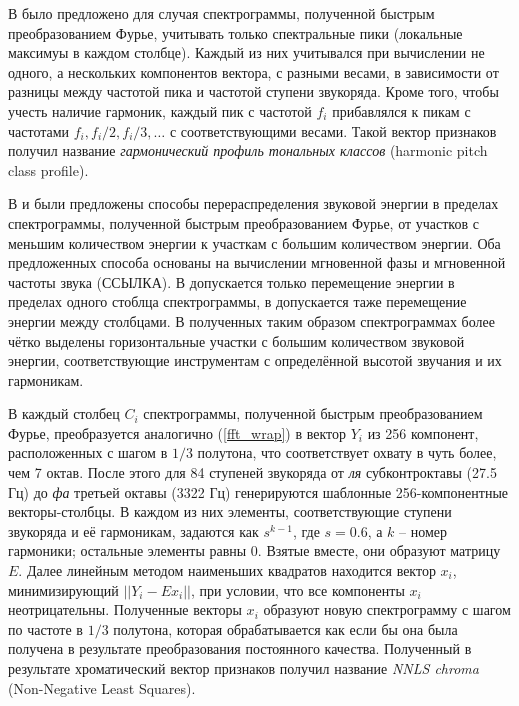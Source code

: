 В \cite{Gomez2006} было предложено для случая спектрограммы, полученной быстрым
преобразованием Фурье, учитывать только спектральные пики (локальные максимуы в
каждом столбце). Каждый из них учитывался при вычислении не одного, а
нескольких компонентов вектора, с разными весами, в зависимости от разницы
между частотой пика и частотой ступени звукоряда. Кроме того, чтобы учесть
наличие гармоник, каждый пик с частотой $f_i$ прибавлялся к пикам с частотами
$f_i, f_i/2, f_i/3, \ldots$ с соответствующими весами. Такой вектор признаков
получил название \emph{гармонический профиль тональных классов} (harmonic
pitch class profile).

В \cite{Weller2009} и \cite{Khadkevich2011} были предложены способы
перераспределения звуковой энергии в пределах спектрограммы, полученной быстрым
преобразованием Фурье, от участков с меньшим количеством энергии к участкам с
большим количеством энергии. Оба предложенных способа основаны на вычислении
мгновенной фазы и мгновенной частоты звука (ССЫЛКА). В \cite{Weller2009}
допускается только перемещение энергии в пределах одного стоблца спектрограммы,
в \cite{Khadkevich2011} допускается таже перемещение энергии между столбцами.
В полученных таким образом спектрограммах более чётко выделены
горизонтальные участки с большим количеством звуковой энергии, соответствующие
инструментам с определённой высотой звучания и их гармоникам.

В \cite{Mauch2010} каждый столбец $C_i$ спектрограммы, полученной быстрым
преобразованием Фурье, преобразуется аналогично (\ref{fft_wrap}) в вектор $Y_i$
из 256 компонент, расположенных с шагом в $1/3$ полутона, что соответствует
охвату в чуть более, чем 7 октав. После этого для 84 ступеней звукоряда от
\emph{ля} субконтроктавы (27.5 Гц) до \emph{фа} третьей октавы (3322 Гц)
генерируются шаблонные 256-компонентные векторы-столбцы. В каждом из них
элементы, соответствующие ступени звукоряда и её гармоникам, задаются как
$s^{k-1}$, где $s=0.6$, а $k$ -- номер гармоники; остальные элементы равны 0.
Взятые вместе, они образуют матрицу $E$. Далее линейным методом наименьших
квадратов находится вектор $x_i$, минимизирующий $||Y_i - Ex_i||$, при условии,
что все компоненты $x_i$ неотрицательны. Полученные векторы $x_i$ образуют новую
спектрограмму с шагом по частоте в $1/3$ полутона, которая обрабатывается как
если бы она была получена в результате преобразования постоянного качества.
Полученный в результате хроматический вектор признаков получил название
\emph{NNLS chroma} (Non-Negative Least Squares).


